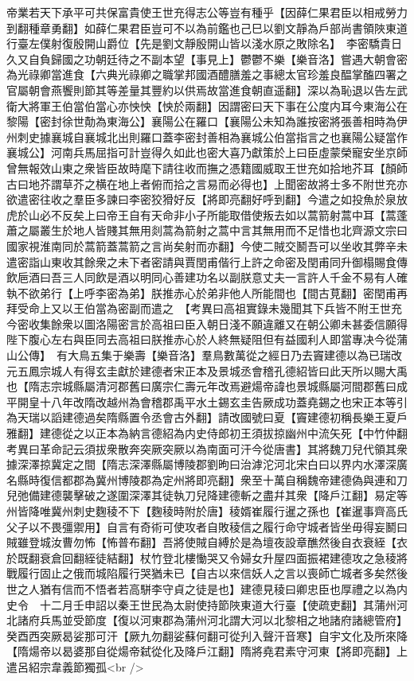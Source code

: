 帝業若天下承平可共保富貴使王世充得志公等豈有種乎【因薛仁果君臣以相戒勞力到翻種章勇翻】如薛仁果君臣豈可不以為前鑑也己巳以劉文靜為戶部尚書領陜東道行臺左僕射復殷開山爵位【先是劉文靜殷開山皆以淺水原之敗除名】　李密驕貴日久又自負歸國之功朝廷待之不副本望【事見上】鬱鬱不樂【樂音洛】嘗遇大朝會密為光祿卿當進食【六典光祿卿之職掌邦國酒醴膳羞之事總太官珍羞良醖掌醢四署之官屬朝會燕饗則節其等差量其豐約以供焉故當進食朝直遥翻】深以為恥退以告左武衛大將軍王伯當伯當心亦怏怏【怏於兩翻】因謂密曰天下事在公度内耳今東海公在黎陽【密封徐世勣為東海公】襄陽公在羅口【襄陽公未知為誰按密將張善相時為伊州刺史據襄城自襄城北出則羅口蓋李密封善相為襄城公伯當指言之也襄陽公疑當作襄城公】河南兵馬屈指可計豈得久如此也密大喜乃獻策於上曰臣虛蒙榮寵安坐京師曾無報效山東之衆皆臣故時麾下請往收而撫之憑籍國威取王世充如拾地芥耳【顏師古曰地芥謂草芥之横在地上者俯而拾之言易而必得也】上聞密故將士多不附世充亦欲遣密往收之羣臣多諫曰李密狡猾好反【將即亮翻好呼到翻】今遣之如投魚於泉放虎於山必不反矣上曰帝王自有天命非小子所能取借使叛去如以蒿箭射蒿中耳【蒿蓬蕭之屬叢生於地人皆賤其無用剡蒿為箭射之蒿中言其無用而不足惜也北齊源文宗曰國家視淮南同於蒿箭蓋蒿箭之言尚矣射而亦翻】今使二賊交鬭吾可以坐收其弊辛未遣密詣山東收其餘衆之未下者密請與賈閏甫偕行上許之命密及閏甫同升御榻賜食傳飲巵酒曰吾三人同飲是酒以明同心善建功名以副朕意丈夫一言許人千金不易有人確執不欲弟行【上呼李密為弟】朕推赤心於弟非他人所能間也【間古莧翻】密閏甫再拜受命上又以王伯當為密副而遣之　【考異曰高祖實錄未幾聞其下兵皆不附王世充今密收集餘衆以圖洛陽密言於高祖曰臣入朝日淺不願違離又在朝公卿未甚委信願得陛下腹心左右與臣同去高祖曰朕推赤心於人終無疑阻但有益國利人即當專决今從蒲山公傳】　有大鳥五集于樂壽【樂音洛】羣鳥數萬從之經日乃去竇建德以為已瑞改元五鳳宗城人有得玄圭獻於建德者宋正本及景城丞會稽孔德紹皆曰此天所以賜大禹也【隋志宗城縣屬清河郡舊曰廣宗仁壽元年改焉避煬帝諱也景城縣屬河間郡舊曰成平開皇十八年改隋改越州為會稽郡禹平水土錫玄圭告厥成功蓋堯錫之也宋正本等引為天瑞以謟建德過矣隋縣置令丞會古外翻】請改國號曰夏【竇建德初稱長樂王夏戶雅翻】建德從之以正本為納言德紹為内史侍郎初王須拔掠幽州中流矢死【中竹仲翻　考異曰革命記云須拔衆散奔突厥突厥以為南面可汗今從唐書】其將魏刀兒代領其衆據深澤掠冀定之間【隋志深澤縣屬博陵郡劉昫曰治滹沱河北宋白曰以界内水澤深廣名縣時復信都郡為冀州博陵郡為定州將即亮翻】衆至十萬自稱魏帝建德偽與連和刀兒弛備建德襲擊破之遂圍深澤其徒執刀兒降建德斬之盡幷其衆【降戶江翻】易定等州皆降唯冀州刺史麴稜不下【麴稜時附於唐】稜婿崔履行暹之孫也【崔暹事齊高氏父子以不畏彊禦用】自言有奇術可使攻者自敗稜信之履行命守城者皆坐毋得妄鬭曰賊雖登城汝曹勿怖【怖普布翻】吾將使賊自縛於是為壇夜設章醮然後自衣衰絰【衣於既翻衰倉回翻絰徒結翻】杖竹登北樓慟哭又令婦女升屋四面振裙建德攻之急稜將戰履行固止之俄而城陷履行哭猶未已【自古以來信妖人之言以喪師亡城者多矣然後世之人猶有信而不悟者若高駢李守貞之徒是也】建德見稜曰卿忠臣也厚禮之以為内史令　十二月壬申詔以秦王世民為太尉使持節陜東道大行臺【使疏吏翻】其蒲州河北諸府兵馬並受節度【復以河東郡為蒲州河北謂大河以北黎相之地諸府諸總管府】　癸酉西突厥曷娑那可汗【厥九勿翻娑蘇何翻可從刋入聲汗音寒】自宇文化及所來降【隋煬帝以曷婆那自從煬帝弑從化及降戶江翻】隋將堯君素守河東【將即亮翻】上遣呂紹宗韋義節獨孤<br />
